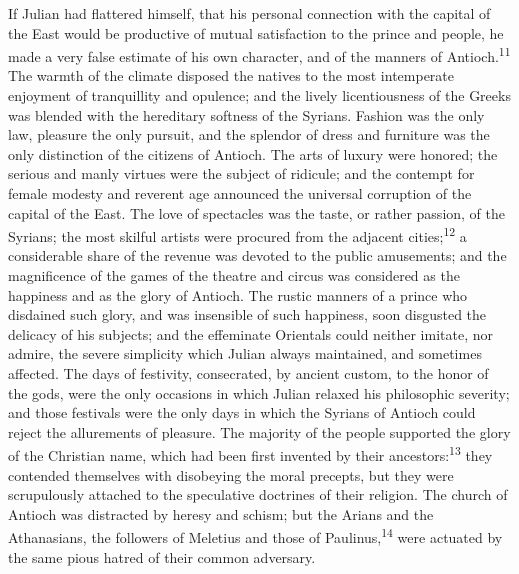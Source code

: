 If Julian had flattered himself, that his personal connection
with the capital of the East would be productive of mutual
satisfaction to the prince and people, he made a very false
estimate of his own character, and of the manners of Antioch.\textsuperscript{11}
The warmth of the climate disposed the natives to the most
intemperate enjoyment of tranquillity and opulence; and the
lively licentiousness of the Greeks was blended with the
hereditary softness of the Syrians. Fashion was the only law,
pleasure the only pursuit, and the splendor of dress and
furniture was the only distinction of the citizens of Antioch.
The arts of luxury were honored; the serious and manly virtues
were the subject of ridicule; and the contempt for female modesty
and reverent age announced the universal corruption of the
capital of the East. The love of spectacles was the taste, or
rather passion, of the Syrians; the most skilful artists were
procured from the adjacent cities;\textsuperscript{12} a considerable share of the
revenue was devoted to the public amusements; and the
magnificence of the games of the theatre and circus was
considered as the happiness and as the glory of Antioch. The
rustic manners of a prince who disdained such glory, and was
insensible of such happiness, soon disgusted the delicacy of his
subjects; and the effeminate Orientals could neither imitate, nor
admire, the severe simplicity which Julian always maintained, and
sometimes affected. The days of festivity, consecrated, by
ancient custom, to the honor of the gods, were the only occasions
in which Julian relaxed his philosophic severity; and those
festivals were the only days in which the Syrians of Antioch
could reject the allurements of pleasure. The majority of the
people supported the glory of the Christian name, which had been
first invented by their ancestors:\textsuperscript{13} they contended themselves
with disobeying the moral precepts, but they were scrupulously
attached to the speculative doctrines of their religion. The
church of Antioch was distracted by heresy and schism; but the
Arians and the Athanasians, the followers of Meletius and those
of Paulinus,\textsuperscript{14} were actuated by the same pious hatred of their
common adversary.



